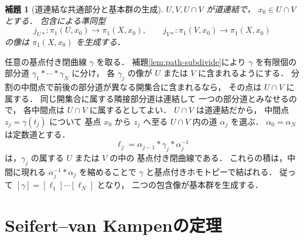\documentclass[a5paper,10pt,onecolumn]{jsarticle}
\makeatletter
\theoremstyle{mathnotetheorem}
\newtheorem{lemma}[theorem]{補題}
\renewcommand{\proofname}{証明}
\renewenvironment{proof}[1][\proofname]{%
  \par\pushQED{\qed}\normalfont\topsep4\p@\@plus2\p@\relax
  \trivlist\item[\hskip\labelsep\bfseries #1]\ignorespaces
}{\popQED\endtrivlist\@endpefalse}
\makeatother
\begin{document}
\begin{lemma}[道連結な共通部分と基本群の生成]\label{lem:surjectivity}
$U,V,U\cap V$ が道連結で，
$x_0\in U\cap V$ とする．
包含による準同型
\[
 j_{U*}:\pi_1(U,x_0)\to\pi_1(X,x_0),\qquad
 j_{V*}:\pi_1(V,x_0)\to\pi_1(X,x_0)
\]
の像は $\pi_1(X,x_0)$ を生成する．
\end{lemma}
\begin{proof}
任意の基点付き閉曲線 $\gamma$ を取る．
補題\ref{lem:path-subdivide}により
$\gamma$ を有限個の部分道
$\gamma_1*\cdots*\gamma_N$ に分け，
各 $\gamma_j$ の像が $U$ または $V$ に含まれるようにする．
分割の中間点で前後の部分道が異なる開集合に含まれるなら，
その点は $U\cap V$ に属する．
同じ開集合に属する隣接部分道は連結して
一つの部分道とみなせるので，
各中間点は $U\cap V$ に属するとしてよい．
$U\cap V$ は道連結だから，
中間点 $z_j=\gamma(t_j)$ について
基点 $x_0$ から $z_j$ へ至る
$U\cap V$ 内の道 $\alpha_j$ を選ぶ．
$\alpha_0=\alpha_N$ は定数道とする．
\[
 \ell_j=\alpha_{j-1}*\gamma_j*\alpha_j^{-1}
\]
は，$\gamma_j$ の属する $U$ または $V$ の中の
基点付き閉曲線である．
これらの積は，中間に現れる
$\alpha_j^{-1}*\alpha_j$ を縮めることで
$\gamma$ と基点付きホモトピーで結ばれる．
従って
$[\gamma]=[\ell_1]\cdots[\ell_N]$ となり，
二つの包含像が基本群を生成する．
\end{proof}

\section{Seifert--van Kampenの定理}
\end{document}
